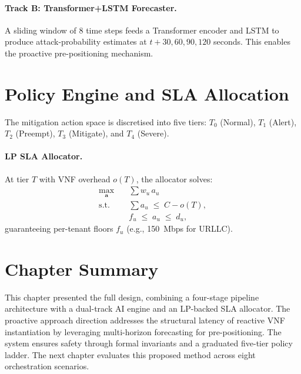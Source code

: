 \paragraph{Track B: Transformer+LSTM Forecaster.} A sliding window of 8 time steps feeds a Transformer encoder and LSTM to produce attack-probability estimates at $t+30, 60, 90, 120$ seconds. This enables the proactive pre-positioning mechanism.

\section{Policy Engine and SLA Allocation}
\label{sec:policy-sla}

The mitigation action space is discretised into five tiers: $T_0$ (Normal), $T_1$ (Alert), $T_2$ (Preempt), $T_3$ (Mitigate), and $T_4$ (Severe).

\paragraph{LP SLA Allocator.} At tier $T$ with VNF overhead $o(T)$, the allocator solves:
\begin{align}
  \max_{\mathbf{a}} &\quad \sum w_u \, a_u \nonumber \\
  \text{s.t.} &\quad \sum a_u \;\leq\; C - o(T), \nonumber \\
  &\quad f_u \;\leq\; a_u \;\leq\; d_u, \nonumber
\end{align}
guaranteeing per-tenant floors $f_u$ (e.g., 150~Mbps for URLLC).

\section{Chapter Summary}
\label{sec:proposed-summary}

This chapter presented the full \padonap{} design, combining a four-stage pipeline architecture with a dual-track AI engine and an LP-backed SLA allocator. The proactive approach direction addresses the structural latency of reactive VNF instantiation by leveraging multi-horizon forecasting for pre-positioning. The system ensures safety through formal invariants and a graduated five-tier policy ladder. The next chapter evaluates this proposed method across eight orchestration scenarios.
